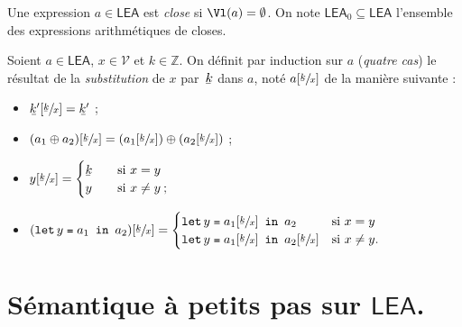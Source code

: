 \documentclass[../main]{subfiles}
\begin{document}
  \begin{defn}
    Une expression $a \in \mathsf{LEA}$ est \textit{close} si $\Vl(a) = \emptyset$.
    On note $\mathsf{LEA}_0 \subseteq \mathsf{LEA}$ l'ensemble des expressions arithmétiques de closes.
  \end{defn}

  \begin{defn}
    Soient $a \in \mathsf{LEA}$, $x \in \mathcal{V}$ et $k \in \mathds{Z}$.
    On définit par induction sur $a$ (\textit{quatre cas}) le résultat de la \textit{substitution} de $x$ par~$\ubar k$ dans $a$, noté $a[\sfrac{\ubar k}{x}]$ de la manière suivante :
    \begin{itemize}
      \item $\ubar{k'}[\sfrac{\ubar k}{x}] = \ubar{k'}$ ;
      \item $(a_1 \oplus a_2)[\sfrac{\ubar k}{x}] = (a_1[\sfrac{\ubar k}{x}]) \oplus (a_2[\sfrac{\ubar k}{x}])$ ;
      \item $y[\sfrac{\ubar k}{x}] = \begin{cases}
          \ubar k \quad& \text{si}\ x = y\\
          y \quad& \text{si}\ x \neq y\: ;
      \end{cases}$
    \item $(\letin y {a_1} {a_2})[\sfrac{\ubar k}{x}] = \begin{cases}
        \letin y {a_1[\sfrac{\ubar k}{x}]} a_2 & \text{si}\ x = y\\
        \letin y {a_1[\sfrac{\ubar k}{x}]} a_2[\sfrac{\ubar k}{x}] & \text{si}\ x \neq y.
    \end{cases}$
    \end{itemize}
  \end{defn}

  \section{Sémantique à petits pas sur $\mathsf{LEA}$.}
\end{document}
